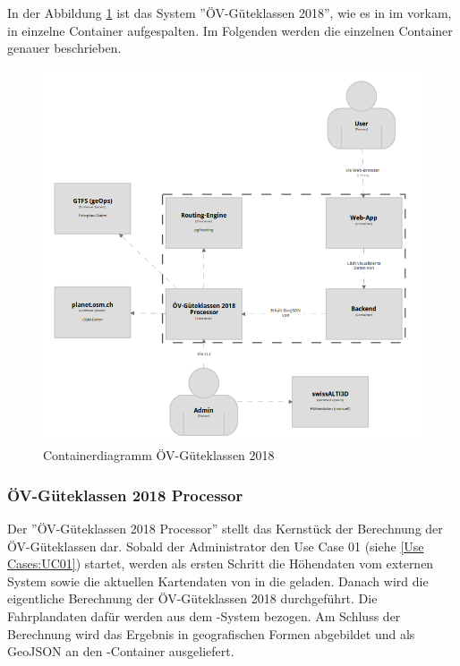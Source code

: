 In der Abbildung \ref{fig:container-diagram} ist das System ''ÖV-Güteklassen 2018'', wie es in im  vorkam, in einzelne Container aufgespalten.
Im Folgenden werden die einzelnen Container genauer beschrieben.

\begin{figure}[ht]
    \centering
    \includegraphics[width=0.8\linewidth]{projectdoc/img/container-diagram.png}
    \caption[ht]{}
    \caption[Containerdiagramm]{Containerdiagramm ÖV-Güteklassen 2018}
    \label{fig:container-diagram}
\end{figure}

\subsubsection{ÖV-Güteklassen 2018 Processor}
\label{container:processor}

Der ''\acs{ÖV}-Güteklassen 2018 Processor'' stellt das Kernstück der Berechnung der \acs{ÖV}-Güteklassen dar.
Sobald der Administrator den Use Case 01 (siehe \ref{Use Cases:UC01}) startet, werden als ersten Schritt die Höhendaten vom externen System  sowie die aktuellen Kartendaten von  in die  geladen.
Danach wird die eigentliche Berechnung der \acs{ÖV}-Güteklassen 2018 durchgeführt.
Die Fahrplandaten dafür werden aus dem -System bezogen.
Am Schluss der Berechnung wird das Ergebnis in geografischen Formen abgebildet und als \gls{GeoJSON} an den -Container ausgeliefert.

